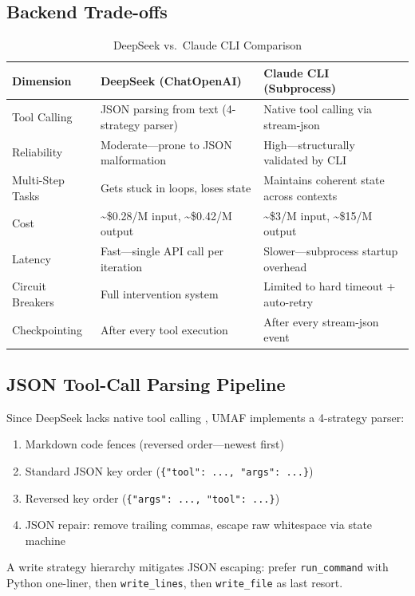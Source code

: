 \subsection{Backend Trade-offs}

\begin{table}[H]
\centering
\small
\caption{DeepSeek vs.\ Claude CLI Comparison}
\label{tab:backend}
\begin{tabular}{@{}p{3cm}p{5.2cm}p{5.2cm}@{}}
\toprule
\textbf{Dimension} & \textbf{DeepSeek (ChatOpenAI)} & \textbf{Claude CLI (Subprocess)} \\
\midrule
Tool Calling & JSON parsing from text (4-strategy parser) & Native tool calling via stream-json \\
Reliability & Moderate---prone to JSON malformation & High---structurally validated by CLI \\
Multi-Step Tasks & Gets stuck in loops, loses state & Maintains coherent state across contexts \\
Cost & \textasciitilde\$0.28/M input, \textasciitilde\$0.42/M output & \textasciitilde\$3/M input, \textasciitilde\$15/M output \\
Latency & Fast---single API call per iteration & Slower---subprocess startup overhead \\
Circuit Breakers & Full intervention system & Limited to hard timeout + auto-retry \\
Checkpointing & After every tool execution & After every stream-json event \\
\bottomrule
\end{tabular}
\end{table}

\subsection{JSON Tool-Call Parsing Pipeline}

Since DeepSeek lacks native tool calling \cite{deepseekv3,deepseekr1}, UMAF implements a 4-strategy parser:
\begin{enumerate}
    \item Markdown code fences (reversed order---newest first)
    \item Standard JSON key order (\texttt{\{"tool": ..., "args": ...\}})
    \item Reversed key order (\texttt{\{"args": ..., "tool": ...\}})
    \item JSON repair: remove trailing commas, escape raw whitespace via state machine
\end{enumerate}
A write strategy hierarchy mitigates JSON escaping: prefer \texttt{run\_command} with Python one-liner, then \texttt{write\_lines}, then \texttt{write\_file} as last resort.
